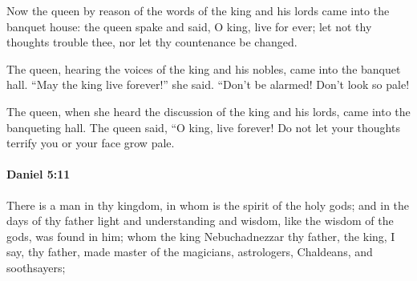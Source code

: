 			\begin{versebox}
					\item[BHS] 
					\item[LXX] 
					\item[ASV] Now the queen by reason of the words of the king and his lords came into the banquet house: the queen spake and said, O king, live for ever; let not thy thoughts trouble thee, nor let thy countenance be changed.
					\item[NIV] The queen, hearing the voices of the king and his nobles, came into the banquet hall. “May the king live forever!” she said. “Don’t be alarmed! Don’t look so pale!
					\item[NRSV] The queen, when she heard the discussion of the king and his lords, came into the banqueting hall. The queen said, “O king, live forever! Do not let your thoughts terrify you or your face grow pale.
			\end{versebox}

		\paragraph{Daniel 5:11} %
			\label{DANIEL-5-11}

			There is a man in thy kingdom, in whom is the spirit of the holy gods; and in the days of thy father light and understanding and wisdom, like the wisdom of the gods, was found in him; whom the king Nebuchadnezzar thy father, the king, I say, thy father, made master of the magicians, astrologers, Chaldeans, and soothsayers;

